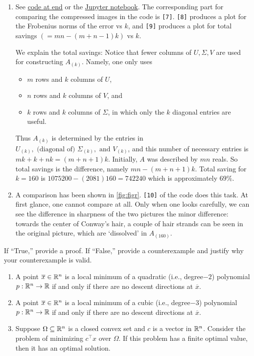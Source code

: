 \begin{enumerate}[leftmargin=*]
\item 
See \hyperref[pdf:imgcom]{code at end} or the \href{https://github.com/nilavam/nilavam.github.io/blob/5552db4aab806c636c3de2188940259679bd212a/ConOpt/HW1/image%20compression.ipynb}{Jupyter notebook}.
The corresponding part for comparing the compressed images in the code is \texttt{[7]}. \texttt{[8]} produces a plot for the Frobenius norms of the error vs $k$, and \texttt{[9]} produces a plot for total savings $\left(=mn-(m+n-1)k\right)$ vs $k$.

We explain the total savings:
Notice that fewer columns of $U,\Sigma,V$ are used for constructing $A_{(k)}$. Namely, one only uses \begin{itemize}
\item $m$ rows and $k$ columns of $U$,
\item $n$ rows and $k$ columns of $V$, and
\item $k$ rows and $k$ columns of $\Sigma$, in which only the $k$ diagonal entries are useful.
\end{itemize}
Thus $A_{{(k)}}$ is determined by the entries in $U_{(k)}, \text{ (diagonal of) }\Sigma_{(k)}, \text{ and }V_{(k)}$, and this number of necessary entries is $mk+k+nk = (m+n+1)k$. Initially, $A$ was described by $mn$ reals. So total savings is the difference, namely $mn-(m+n+1)k$. Total saving for $k=160$ is $1075200 - (2081)160 = 742240$ which is approximately $69\%$.

\item A comparison has been shown in \cref{fig:figr}. \texttt{[10]} of the code does this task. At first glance, one cannot compare at all. Only when one looks carefully, we can see the difference in sharpness of the two pictures the minor difference: towards the center of Conway's hair, a couple of hair strands can be seen in the original picture, which are `dissolved' in $A_{{(160)}}$.
\end{enumerate}












\newpage
\pb

If ``True,” provide a proof. If ``False,” provide a counterexample and justify why your counterexample is valid.
\begin{enumerate}[leftmargin=*]
\item A point $\overline x \in \mathbb{R}^n$ is a local minimum of a quadratic (i.e., degree$-2$) polynomial $p : \mathbb{R}^n \to \mathbb{R}$ if and only if there are no descent directions at $\overline x$.
\item A point $\overline x \in \mathbb{R}^n$ is a local minimum of a cubic (i.e., degree$-3$) polynomial $p : \mathbb{R}^n \to \mathbb{R}$ if and only if there are no descent directions at $\overline x$.
\item Suppose $\Omega \subseteq \mathbb{R}^n$ is a closed convex set and $c$ is a vector in $\mathbb{R}^n$. Consider the problem of minimizing $c^\top x$ over $\Omega$. If this problem has a finite optimal value, then it has an optimal solution.
\end{enumerate}

